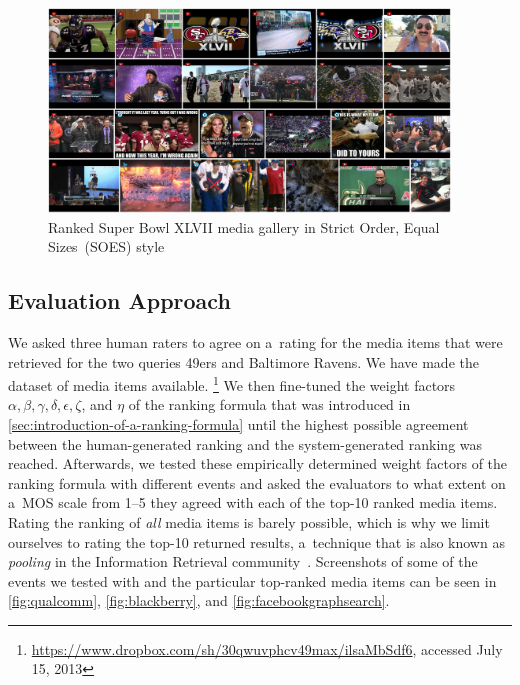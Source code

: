 \begin{figure}
  \centering  \includegraphics[width=0.95\textwidth,height=0.9\textheight,keepaspectratio]{strict_order.png}
  \caption[Ranked Super Bowl media gallery in Strict Order, Equal Sizes style]
  {Ranked Super Bowl XLVII media gallery in Strict Order, Equal Sizes~(SOES) style }
  \label{fig:strict_order}
\end{figure}  

\subsection{Evaluation Approach}

We asked three human raters to agree on a~rating for the media items
that were retrieved for the two queries 49ers and Baltimore Ravens.
We have made the dataset of media items available.%
\footnote{\url{https://www.dropbox.com/sh/30qwuvphcv49max/ilsaMbSdf6},
accessed July 15, 2013}
We then fine-tuned the weight factors
$ \alpha, \beta, \gamma, \delta, \epsilon, \zeta $, and $ \eta $ of the ranking formula
that was introduced in \autoref{sec:introduction-of-a-ranking-formula}
until the highest possible agreement between the human-generated ranking
and the system-generated ranking was reached.
Afterwards, we tested these empirically determined weight factors of the ranking formula
with different events and asked the evaluators to what extent
on a~MOS scale from 1--5 they agreed with each of the top-10 ranked media items.
Rating the ranking of \emph{all} media items is barely possible,
which is why we limit ourselves to rating the top-10 returned results,
a~technique that is also known as \emph{pooling}
in the Information Retrieval community~\cite{liu2009learningtorank}.
Screenshots of some of the events we tested with
and the particular top-ranked media items can be seen in 
\autoref{fig:qualcomm}, \autoref{fig:blackberry}, and \autoref{fig:facebookgraphsearch}.

